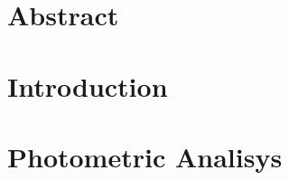 \documentclass[12pt]{article}
\providecommand\phantomsection{} %
\begin{document}
\newpage
\phantomsection
{}
\section*{\centering Abstract}

\newpage
{}


\section{Introduction}
\label{sec:introduction}

%
%
%
%
%

\section{Photometric Analisys}
\label{sec:photometry}
\end{document}
